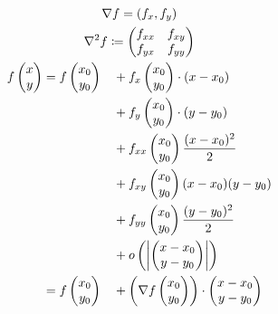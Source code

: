 \begin{gather*}
	\nabla f = (f_x , f_y ) \\
	\nabla^2 f \coloneqq \begin{pmatrix} f_{xx} & f_{xy} \\ f_{yx} & f_{yy} \end{pmatrix} \\
	 \begin{aligned}
		f\begin{pmatrix} x \\ y \end{pmatrix}	&= f\begin{pmatrix} x_0 \\ y_0 \end{pmatrix}	&&+ f_x\begin{pmatrix} x_0 \\ y_0 \end{pmatrix} \cdot (x-x_0) \\
									&									&&+ f_y\begin{pmatrix} x_0 \\ y_0 \end{pmatrix} \cdot (y-y_0) \\
									&									&&+ f_{xx}\begin{pmatrix} x_0 \\ y_0 \end{pmatrix} \frac{(x-x_0)^2}{2} \\
									&									&&+ f_{xy}\begin{pmatrix} x_0 \\ y_0 \end{pmatrix} (x-x_0)(y-y_0) \\
									&									&&+ f_{yy}\begin{pmatrix} x_0 \\ y_0 \end{pmatrix} \frac{(y-y_0)^2}{2} \\
									&									&&+ o\left( \abs{\begin{pmatrix} x-x_0 \\y- y_0 \end{pmatrix}} \right) \\
									&= f\begin{pmatrix} x_0 \\ y_0 \end{pmatrix}	&&+ \left( \nabla f\begin{pmatrix} x_0 \\ y_0 \end{pmatrix} \right) \cdot \begin{pmatrix} x-x_0 \\ y-y_0 \end{pmatrix} \\

\end{aligned}
\end{gather*}
